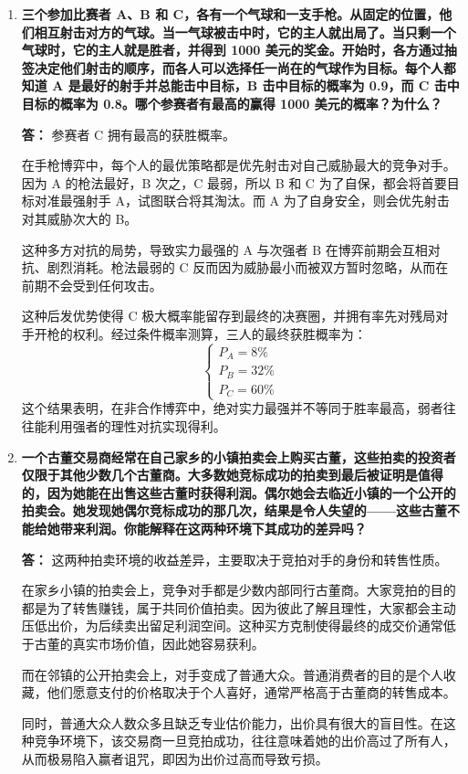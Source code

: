 \begin{enumerate}[label=\textbf{\arabic*.}, leftmargin=*]
		\item \textbf{三个参加比赛者 A、B 和 C，各有一个气球和一支手枪。从固定的位置，他们相互射击对方的气球。当一气球被击中时，它的主人就出局了。当只剩一个气球时，它的主人就是胜者，并得到 1000 美元的奖金。开始时，各方通过抽签决定他们射击的顺序，而各人可以选择任一尚在的气球作为目标。每个人都知道 A 是最好的射手并总能击中目标，B 击中目标的概率为 0.9，而 C 击中目标的概率为 0.8。哪个参赛者有最高的赢得 1000 美元的概率？为什么？}
		
		\textbf{答：}
		参赛者 C 拥有最高的获胜概率。
		
		在手枪博弈中，每个人的最优策略都是优先射击对自己威胁最大的竞争对手。因为 A 的枪法最好，B 次之，C 最弱，所以 B 和 C 为了自保，都会将首要目标对准最强射手 A，试图联合将其淘汰。而 A 为了自身安全，则会优先射击对其威胁次大的 B。
		
		这种多方对抗的局势，导致实力最强的 A 与次强者 B 在博弈前期会互相对抗、剧烈消耗。枪法最弱的 C 反而因为威胁最小而被双方暂时忽略，从而在前期不会受到任何攻击。
		
		这种后发优势使得 C 极大概率能留存到最终的决赛圈，并拥有率先对残局对手开枪的权利。经过条件概率测算，三人的最终获胜概率为：
		\[
		\begin{cases}
			P_A = 8\% \\
			P_B = 32\% \\
			P_C = 60\%
		\end{cases}
		\]
		这个结果表明，在非合作博弈中，绝对实力最强并不等同于胜率最高，弱者往往能利用强者的理性对抗实现得利。
		\newpage
		\item \textbf{一个古董交易商经常在自己家乡的小镇拍卖会上购买古董，这些拍卖的投资者仅限于其他少数几个古董商。大多数她竞标成功的拍卖到最后被证明是值得的，因为她能在出售这些古董时获得利润。偶尔她会去临近小镇的一个公开的拍卖会。她发现她偶尔竞标成功的那几次，结果是令人失望的——这些古董不能给她带来利润。你能解释在这两种环境下其成功的差异吗？}
		
		\textbf{答：}
		这两种拍卖环境的收益差异，主要取决于竞拍对手的身份和转售性质。
		
		在家乡小镇的拍卖会上，竞争对手都是少数内部同行古董商。大家竞拍的目的都是为了转售赚钱，属于共同价值拍卖。因为彼此了解且理性，大家都会主动压低出价，为后续卖出留足利润空间。这种买方克制使得最终的成交价通常低于古董的真实市场价值，因此她容易获利。
		
		而在邻镇的公开拍卖会上，对手变成了普通大众。普通消费者的目的是个人收藏，他们愿意支付的价格取决于个人喜好，通常严格高于古董商的转售成本。
		
		同时，普通大众人数众多且缺乏专业估价能力，出价具有很大的盲目性。在这种竞争环境下，该交易商一旦竞拍成功，往往意味着她的出价高过了所有人，从而极易陷入赢者诅咒，即因为出价过高而导致亏损。
		

\end{enumerate}
